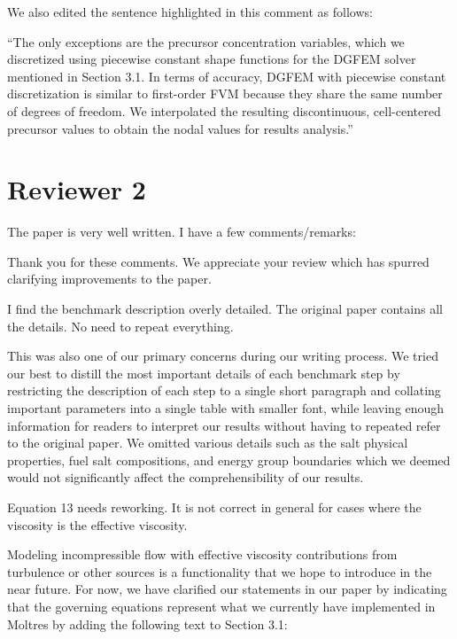 \documentclass[answers,11pt]{exam}
\begin{document}
\begin{questions}
\begin{solution}
        	We also edited the sentence highlighted in this comment
        	as follows:
        	
        	``The only exceptions are the precursor concentration variables,
which we discretized using piecewise constant shape functions for the 
\gls{DGFEM} solver mentioned in Section 3.1. In terms of accuracy, \gls{DGFEM}
with piecewise constant discretization is similar to first-order \gls{FVM}
because they share the same
number of degrees of freedom. We interpolated the resulting discontinuous,
cell-centered precursor values to obtain the nodal values for results
analysis.''
        \end{solution}


\section*{Reviewer 2}

        \question The paper is very well written. I have a few
        comments/remarks:
        \begin{solution}
            Thank you for these comments. We appreciate your review which has
            spurred clarifying improvements to the paper.
        \end{solution}
        \question I find the benchmark description overly detailed. The
        original paper contains all the details. No need to repeat everything.
        \begin{solution}
        	This was also one of our primary concerns during our writing
        	process. We tried our best to distill the most important details
        	of each benchmark step by restricting the description of each step
        	to a single short paragraph and collating important parameters into
        	a single table with smaller font, while leaving enough information
        	for readers to interpret our results without having to repeated
        	refer to the original paper. We omitted various details such
        	as the salt physical properties, fuel salt compositions, and energy
        	group boundaries which we deemed would not significantly affect
        	the comprehensibility of our results.
        \end{solution}

        \question Equation 13 needs reworking. It is not correct in general for
        cases where the viscosity is the effective viscosity.
        \begin{solution}
        	Modeling incompressible flow with
        	effective viscosity contributions from turbulence or other sources
        	is a functionality that we hope
        	to introduce in the near future. For now, we have clarified our
        	statements in our paper by indicating that the governing equations
        	represent what we currently have implemented in Moltres by adding
        	the following text to Section 3.1:
        	

\end{solution}
\end{questions}
\end{document}
